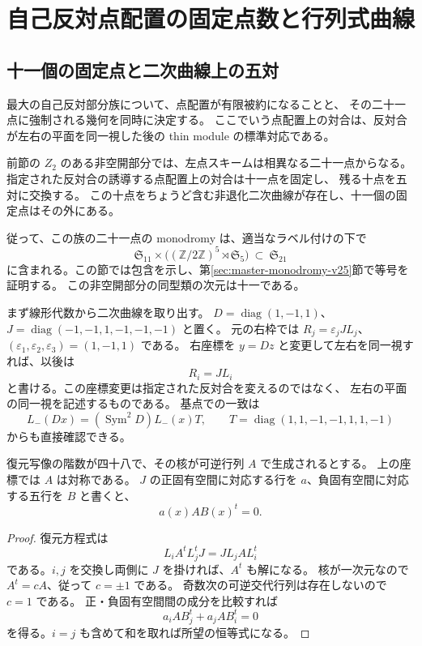 \section{自己反対点配置の固定点数と行列式曲線}\label{sec:self-opposite-21-v24}

\subsection{十一個の固定点と二次曲線上の五対}

最大の自己反対部分族について、点配置が有限被約になることと、
その二十一点に強制される幾何を同時に決定する。
ここでいう点配置上の対合は、反対合が左右の平面を同一視した後の
thin module の標準対応である。

\begin{theorem}[自己反対族の $11+10$ 分解]\label{thm:self-opposite-21-v24}
前節の $Z_2$ のある非空開部分では、左点スキームは相異なる二十一点からなる。
指定された反対合の誘導する点配置上の対合は十一点を固定し、
残る十点を五対に交換する。
この十点をちょうど含む非退化二次曲線が存在し、十一個の固定点はその外にある。

従って、この族の二十一点の monodromy は、適当なラベル付けの下で
\[
 \mathfrak S_{11}\times
 \bigl((\mathbb Z/2\mathbb Z)^5\rtimes\mathfrak S_5\bigr)
 \ \subset\ \mathfrak S_{21}
\]
に含まれる。この節では包含を示し、第\ref{sec:master-monodromy-v25}節で等号を証明する。
この非空開部分の同型類の次元は十一である。
\end{theorem}

まず線形代数から二次曲線を取り出す。
$D=\operatorname{diag}(1,-1,1)$、
$J=\operatorname{diag}(-1,-1,1,-1,-1,-1)$ と置く。
元の右枠では $R_j=\varepsilon_j J L_j$、
$(\varepsilon_1,\varepsilon_2,\varepsilon_3)=(1,-1,1)$ である。
右座標を $y=Dz$ と変更して左右を同一視すれば、以後は
\[
 R_i=J L_i
\]
と書ける。この座標変更は指定された反対合を変えるのではなく、
左右の平面の同一視を記述するものである。
基点での一致は
\[
 L_-(Dx)=(\operatorname{Sym}^2D)L_-(x)T,
 \qquad T=\operatorname{diag}(1,1,-1,-1,1,1,-1)
\]
からも直接確認できる。

\begin{lemma}\label{lem:symmetric-pairing-v24}
復元写像の階数が四十八で、その核が可逆行列 $A$ で生成されるとする。
上の座標では $A$ は対称である。
$J$ の正固有空間に対応する行を $a$、負固有空間に対応する五行を $B$ と書くと、
\begin{equation}\label{eq:self-opposite-orthogonality-v24}
 a(x)A B(x)^t=0.
\end{equation}
\end{lemma}
\begin{proof}
復元方程式は
\[
 L_i A^t L_j^tJ=J L_j A L_i^t
\]
である。$i,j$ を交換し両側に $J$ を掛ければ、$A^t$ も解になる。
核が一次元なので $A^t=cA$、従って $c=\pm1$ である。
奇数次の可逆交代行列は存在しないので $c=1$ である。
正・負固有空間間の成分を比較すれば
\[
 a_i A B_j^t+a_j A B_i^t=0
\]
を得る。$i=j$ も含めて和を取れば所望の恒等式になる。
\end{proof}


